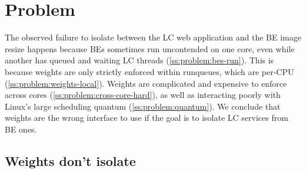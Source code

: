 \section{Problem}\label{s:problem}

The observed failure to isolate between the LC web application and the BE image
resize happens because BEs sometimes run uncontended on one core, even while
another has queued and waiting LC threads (\autoref{ss:problem:bes-run}). This
is because weights are only strictly enforced within runqueues, which are
per-CPU (\autoref{ss:problem:weights-local}). Weights are complicated and
expensive to enforce across cores (\autoref{ss:problem:cross-core-hard}), as
well as interacting poorly with Linux's large scheduling quantum
(\autoref{ss:problem:quantum}). We conclude that weights are the wrong interface
to use if the goal is to isolate LC services from BE ones.

\subsection{Weights don't isolate}\label{ss:problem:bes-run}

